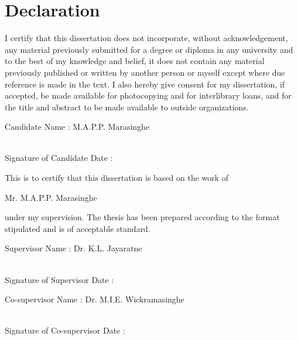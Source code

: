 \chapter*{Declaration}

I certify that this dissertation does not incorporate, without acknowledgement, any material previously submitted for a degree or diploma in any university and to the best of my knowledge and belief, it does not contain any material previously published or written by another person or myself except where due reference is made in the text. I also hereby give consent for my dissertation, if accepted, be made available for photocopying and for interlibrary loans, and for the title and abstract to be made available to outside organizations.

\vspace{0.5cm}
\noindent
Candidate Name : M.A.P.P. Marasinghe

\vspace{1.25cm}
\noindent
\makebox[130pt]{\dotfill} \\
Signature of Candidate \hspace{144pt} Date :


\vspace{1cm}
\noindent
This is to certify that this dissertation is based on the work of

\vspace{6pt}
\noindent
Mr. M.A.P.P. Marasinghe

\vspace{6pt}
\noindent
under my supervision. The thesis has been prepared according to the format stipulated and is of acceptable standard.

\vspace{0.5cm}
\noindent
Supervisor Name : Dr. K.L. Jayaratne

\vspace{1cm}
\noindent
\makebox[130pt]{\dotfill} \\
Signature of Supervisor \hspace{144pt} Date :

\vspace{1cm}
\noindent
Co-supervisor Name : Dr. M.I.E. Wickramasinghe

\vspace{1cm}
\noindent
\makebox[130pt]{\dotfill} \\
Signature of Co-supervisor \hspace{128pt} Date :
